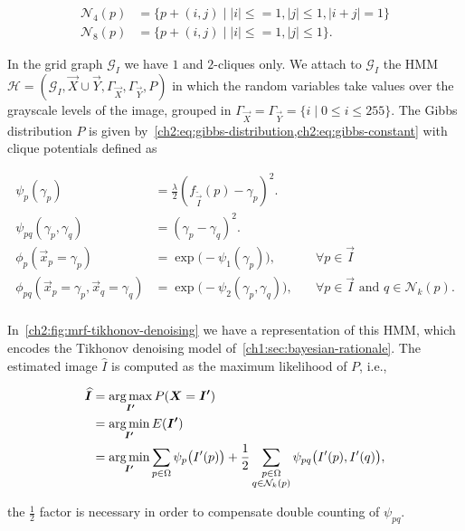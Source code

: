 \begin{align*}
	\mathcal{N}_4(p) &= \{ p + (i,j) \; | \; |i| \leq=1, |j| \leq 1, |i+j|=1 \}\\
	\mathcal{N}_8(p) &= \{ p + (i,j) \; | \; |i| \leq=1, |j| \leq 1 \}.
\end{align*}

In the grid graph $\mathcal{G}_I$ we have $1$ and $2$-cliques only. We attach to $\mathcal{G}_I$ the HMM $\mathcal{H} = (\mathcal{G}_I,\vec{X} \cup \vec{Y},\Gamma_{\vec{X}},\Gamma_{\vec{Y}},P)$ in which the random variables take values over the grayscale levels of the image, grouped in $\Gamma_{\vec{X}} = \Gamma_{\vec{Y}} = \{i \; | \; 0 \leq i \leq 255 \}$. The Gibbs distribution $P$ is given by~\cref{ch2:eq:gibbs-distribution,ch2:eq:gibbs-constant} with clique potentials defined as

\begin{equation*}
	\begin{array}{rll}
	\psi_{p}(\gamma_p) &=  \frac{\lambda}{2} \left( f_{\widetilde{\vec{I}}}(p) - \gamma _p \right) ^2. & \\
	\psi_{pq}(\gamma_p, \gamma_q) &= ( \gamma _p - \gamma _q )^2. &\\[1em]
	\phi_p(\vec{x}_p=\gamma _p) &= \exp\big( - \psi_1(\gamma_p) \big),& \quad \forall p \in \vec{I} \\
	\phi_{pq}(\vec{x}_p=\gamma_p, \vec{x}_q=\gamma _q) &= \exp\big( - \psi_{2}(\gamma_p,\gamma_q) \big),& \quad \forall p \in \vec{I} \text{ and }  q \in \mathcal{N}_k(p). \\
	\end{array}
\end{equation*}

In~\cref{ch2:fig:mrf-tikhonov-denoising} we have a representation of this HMM, which encodes the Tikhonov denoising model of~\cref{ch1:sec:bayesian-rationale}. The estimated image $\widehat{I}$ is computed as the maximum likelihood of $P$, i.e.,

\begin{align*}
	\widehat{\bm{I}} &= \operatorname*{arg\,max}_{\bm{I'}}{P(\bm{X}=\bm{I'})} \\
	&= \operatorname*{arg\,min}_{\bm{I'}}{E(\bm{I'})} \\
	&= \operatorname*{arg\,min}_{\bm{I'}}{\sum_{p \in \Omega}{\psi_p\big({I'(p)}\big)}} + \frac{1}{2}\sum_{ \substack{ p \in \Omega \\ q \in \mathcal{N}_k(p)}}{\psi_{pq}\big( {I'(p),I'(q) \big)}},
\end{align*}

the $\frac{1}{2}$ factor is necessary in order to compensate double counting of $\psi_{pq}$.

